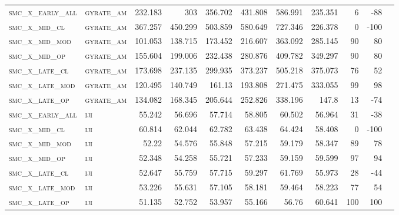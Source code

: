 \begin{landscape}
\begin{center}
\begin{footnotesize}
\begin{longtable}{llrrrrrr|rrr}
\textsc{smc\_x\_early\_all} & \textsc{gyrate\_am}   & 232.183    & 303        & 356.702    & 431.808    & 586.991    & 235.351    & 6     & -88    \\
\textsc{smc\_x\_mid\_cl   } & \textsc{gyrate\_am}   & 367.257    & 450.299    & 503.859    & 580.649    & 727.346    & 226.378    & 0     & -100   \\
\textsc{smc\_x\_mid\_mod  } & \textsc{gyrate\_am}   & 101.053    & 138.715    & 173.452    & 216.607    & 363.092    & 285.145    & 90    & 80     \\
\textsc{smc\_x\_mid\_op   } & \textsc{gyrate\_am}   & 155.604    & 199.006    & 232.438    & 280.876    & 409.782    & 349.297    & 90    & 80     \\
\textsc{smc\_x\_late\_cl  } & \textsc{gyrate\_am}   & 173.698    & 237.135    & 299.935    & 373.237    & 505.218    & 375.073    & 76    & 52     \\
\textsc{smc\_x\_late\_mod } & \textsc{gyrate\_am}   & 120.495    & 140.749    & 161.13     & 193.808    & 271.475    & 333.055    & 99    & 98     \\
\textsc{smc\_x\_late\_op  } & \textsc{gyrate\_am}   & 134.082    & 168.345    & 205.644    & 252.826    & 338.196    & 147.8      & 13    & -74    \\
\textsc{smc\_x\_early\_all} & \textsc{iji       }   & 55.242     & 56.696     & 57.714     & 58.805     & 60.502     & 56.964     & 31    & -38    \\
\textsc{smc\_x\_mid\_cl   } & \textsc{iji       }   & 60.814     & 62.044     & 62.782     & 63.438     & 64.424     & 58.408     & 0     & -100   \\
\textsc{smc\_x\_mid\_mod  } & \textsc{iji       }   & 52.22      & 54.576     & 55.848     & 57.215     & 59.179     & 58.347     & 89    & 78     \\
\textsc{smc\_x\_mid\_op   } & \textsc{iji       }   & 52.348     & 54.258     & 55.721     & 57.233     & 59.159     & 59.599     & 97    & 94     \\
\textsc{smc\_x\_late\_cl  } & \textsc{iji       }   & 52.647     & 55.759     & 57.715     & 59.297     & 61.769     & 55.973     & 28    & -44    \\
\textsc{smc\_x\_late\_mod } & \textsc{iji       }   & 53.226     & 55.631     & 57.105     & 58.181     & 59.464     & 58.223     & 77    & 54     \\
\textsc{smc\_x\_late\_op  } & \textsc{iji       }   & 51.135     & 52.752     & 53.957     & 55.166     & 56.76      & 60.641     & 100   & 100    \\

\end{longtable}
\end{footnotesize}
\end{center}
\end{landscape}
